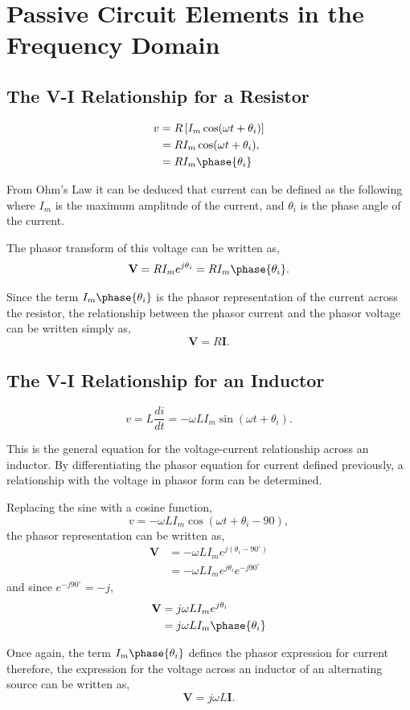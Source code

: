 \documentclass[12pt]{article}
\begin{document}
    \section*{Passive Circuit Elements in the Frequency Domain}
    \subsection*{The V-I Relationship for a Resistor}
    \begin{align*}
        v &= R \left[ I_m \cos (\omega t + \theta_i) \right]  \\
          &= R I_m \cos (\omega t + \theta_i), \\
          &= R I_m \phase{\theta_i}
    \end{align*}
    \par From Ohm's Law it can be deduced that current can be defined as the
    following where $I_m$ is the maximum amplitude of the current, and
    $\theta_i$ is the phase angle of the current.
    \par The phasor transform of this voltage can be written as,
    \[
        \textbf{V} = R I_m e^{j \theta_i} = R I_m \phase{\theta_i}
    .\]
    \par Since the term $I_m \phase{\theta_i}$ is the phasor representation of
    the current across the resistor, the relationship between the phasor current
    and the phasor voltage can be written simply as,
    \[
        \textbf{V} = R \textbf{I}
    .\]
    \subsection*{The V-I Relationship for an Inductor}
    \[
        v = L \frac{di}{dt} = -\omega L I_m \sin (\omega t + \theta_i)
    .\]
    \par This is the general equation for the voltage-current relationship
    across an inductor. By differentiating the phasor equation for current
    defined previously, a relationship with the voltage in phasor form can be
    determined.
    \par Replacing the sine with a cosine function,
    \[
        v = -\omega L I_m \cos (\omega t + \theta_i - 90)
    ,\]
    the phasor representation can be written as,
    \begin{align*}
        \textbf{V} &= -\omega L I_m e^{j(\theta_i - 90^{\circ})} \\
                   &= -\omega L I_m e^{j\theta_i} e^{-j 90^{\circ}}
    \end{align*}
    and since $e^{-j 90^{\circ}} = -j$,
    \begin{align*}
        \textbf{V} &= j \omega L I_m e^{j \theta_i} \\
                   &= j \omega L I_m \phase{\theta_i}
    \end{align*}
    \par Once again, the term $I_m \phase{\theta_i}$ defines the phasor
    expression for current therefore, the expression for the voltage across an
    inductor of an alternating source can be written as,
    \[
        \textbf{V} = j \omega L \textbf{I}
    .\]
\end{document}
